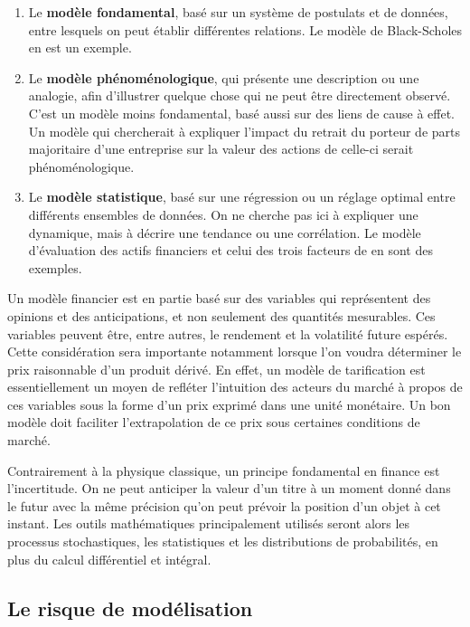 \begin{enumerate}
\item Le \textbf{modèle fondamental}, basé sur un système de postulats
  et de données, entre lesquels on peut établir différentes
  relations. Le modèle de Black-Scholes en est un exemple.
\item Le \textbf{modèle phénoménologique}, qui présente une
  description ou une analogie, afin d'illustrer quelque chose qui ne
  peut être directement observé. C'est un modèle moins fondamental,
  basé aussi sur des liens de cause à effet. Un modèle qui chercherait
  à expliquer l'impact du retrait du porteur de parts majoritaire
  d'une entreprise sur la valeur des actions de celle-ci serait
  phénoménologique.
\item Le \textbf{modèle statistique}, basé sur une régression ou un
  réglage optimal entre différents ensembles de données. On ne cherche
  pas ici à expliquer une dynamique, mais à décrire une tendance ou
  une corrélation. Le modèle d'évaluation des actifs financiers et
  celui des trois facteurs de \cite{fama1993common} en sont des exemples.
\end{enumerate}

Un modèle financier est en partie basé sur des variables qui
représentent des opinions et des anticipations, et non seulement des
quantités mesurables. Ces variables peuvent être, entre autres, le
rendement et la volatilité future espérés. Cette considération sera
importante notamment lorsque l'on voudra déterminer le prix
raisonnable d'un produit dérivé. En effet, un modèle de tarification
est essentiellement un moyen de refléter l'intuition des acteurs du
marché à propos de ces variables sous la forme d'un prix exprimé dans
une unité monétaire. Un bon modèle doit faciliter l'extrapolation de
ce prix sous certaines conditions de marché.

Contrairement à la physique classique, un principe fondamental en
finance est l'incertitude. On ne peut anticiper la valeur d'un titre à
un moment donné dans le futur avec la même précision qu'on peut
prévoir la position d'un objet à cet instant. Les outils mathématiques
principalement utilisés seront alors les processus stochastiques, les
statistiques et les distributions de probabilités, en plus du calcul
différentiel et intégral.

\subsection{Le risque de modélisation}
\label{sec:modelerisque}

